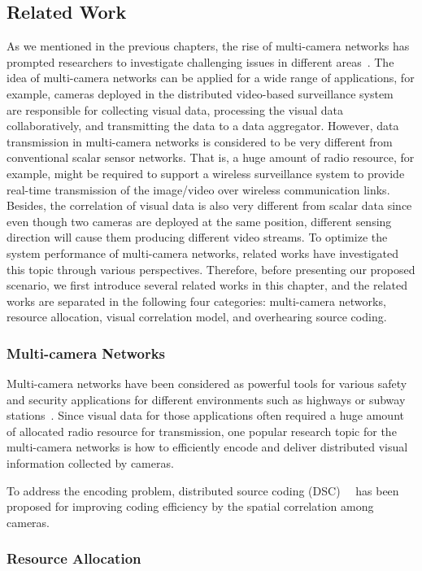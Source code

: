 \subsection{Related Work}
\label{sec::relatedWork}
As we mentioned in the previous chapters, the rise of multi-camera networks has prompted researchers to investigate challenging issues in different areas~\cite{VsnChallenges}.
The idea of multi-camera networks can be applied for a wide range of applications, for example, cameras deployed in the distributed video-based surveillance system~\cite{VideoBasedSurveillanceSystem} are responsible for collecting visual data, processing the visual data collaboratively, and transmitting the data to a data aggregator.
However, data transmission in multi-camera networks is considered to be very different from conventional scalar sensor networks.
That is, a huge amount of radio resource, for example, might be required to support a wireless surveillance system to provide real-time transmission of the image/video over wireless communication links.
Besides, the correlation of visual data is also very different from scalar data since even though two cameras are deployed at the same position, different sensing direction will cause them producing different video streams.
To optimize the system performance of multi-camera networks, related works have investigated this topic through various perspectives.
Therefore, before presenting our proposed scenario, we first introduce several related works in this chapter, and the related works are separated in the following four categories: multi-camera networks, resource allocation, visual correlation model, and overhearing source coding.
%
\subsubsection{Multi-camera Networks}
Multi-camera networks have been considered as powerful tools for various safety and security applications for different environments such as highways or subway stations~\cite{MultiCameraNetworksBook}.
Since visual data for those applications often required a huge amount of allocated radio resource for transmission, one popular research topic for the multi-camera networks is how to efficiently encode and deliver distributed visual information collected by cameras.

To address the encoding problem, distributed source coding (DSC)~\cite{SlepianWolf}~\cite{WynerZiv} has been proposed for improving coding efficiency by the spatial correlation among cameras.
%
\subsubsection{Resource Allocation}
%
